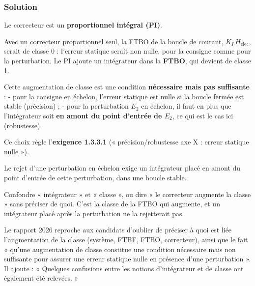 \documentclass[11pt,a4paper]{article}
\begin{document}
\hypertarget{solution-24}{%
\subsubsection{Solution}\label{solution-24}}

Le correcteur est un \textbf{proportionnel intégral (PI)}.

Avec un correcteur proportionnel seul, la FTBO de la boucle de courant, \(K_I\,H_{\text{élec}}\), serait de classe 0 : l'erreur statique serait non nulle, pour la consigne comme pour la perturbation. Le PI ajoute un intégrateur dans la \textbf{FTBO}, qui devient de classe 1.

Cette augmentation de classe est une condition \textbf{nécessaire mais pas suffisante} :
- pour la consigne en échelon, l'erreur statique est nulle si la boucle fermée est stable (précision) ;
- pour la perturbation \(E_2\) en échelon, il faut en plus que l'intégrateur soit \textbf{en amont du point d'entrée de \(E_2\)}, ce qui est le cas ici (robustesse).

Ce choix règle l'\textbf{exigence 1.3.3.1} (« précision/robustesse axe X : erreur statique nulle »).

\begin{methode}

Le rejet d'une perturbation en échelon exige un intégrateur placé en amont du point d'entrée de cette perturbation, dans une boucle stable.

\end{methode}

\begin{piege}

Confondre « intégrateur » et « classe », ou dire « le correcteur augmente la classe » sans préciser de quoi. C'est la classe de la FTBO qui augmente, et un intégrateur placé après la perturbation ne la rejetterait pas.

\end{piege}

\begin{jury}

Le rapport 2026 reproche aux candidats d'oublier de préciser à quoi est liée l'augmentation de la classe (système, FTBF, FTBO, correcteur), ainsi que le fait « qu'une augmentation de classe constitue une condition nécessaire mais non suffisante pour assurer une erreur statique nulle en présence d'une perturbation ». Il ajoute : « Quelques confusions entre les notions d'intégrateur et de classe ont également été relevées. »

\end{jury}
\end{document}
